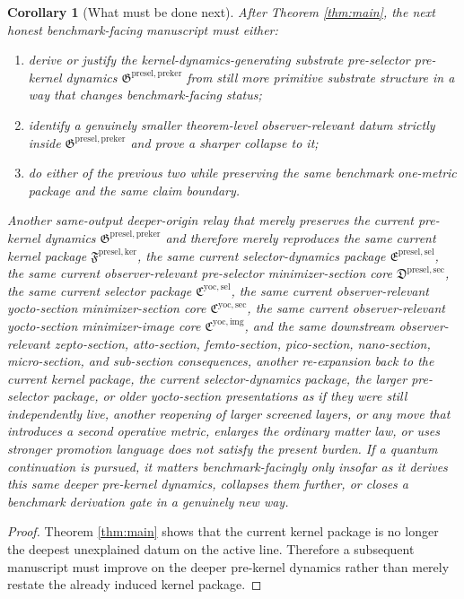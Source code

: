 \documentclass[11pt]{article}
\newcommand{\YoctoImageCore}{\mathfrak C^{\mathrm{yoc,img}}}
\newcommand{\YoctoMinSectionCore}{\mathfrak C^{\mathrm{yoc,sec}}}
\newcommand{\YoctoSelectorPackage}{\mathfrak C^{\mathrm{yoc,sel}}}
\newcommand{\PreSelectorMinSectionCore}{\mathfrak D^{\mathrm{presel,sec}}}
\newcommand{\PreSectionSelectorPackage}{\mathfrak E^{\mathrm{presel,sel}}}
\newcommand{\KernelPackage}{\mathfrak F^{\mathrm{presel,ker}}}
\newcommand{\PreKernelPackage}{\mathfrak G^{\mathrm{presel,preker}}}
\newtheorem{corollary}{Corollary}
\begin{document}
\begin{corollary}[What must be done next]
\label{cor:next}
After Theorem \ref{thm:main}, the next honest benchmark-facing manuscript must either:
\begin{enumerate}
    \item derive or justify the kernel-dynamics-generating substrate pre-selector pre-kernel dynamics \(\PreKernelPackage\) from still more primitive substrate structure in a way that changes benchmark-facing status;
    \item identify a genuinely smaller theorem-level observer-relevant datum strictly inside \(\PreKernelPackage\) and prove a sharper collapse to it;
    \item do either of the previous two while preserving the same benchmark one-metric package and the same claim boundary.
\end{enumerate}
Another same-output deeper-origin relay that merely preserves the current pre-kernel dynamics \(\PreKernelPackage\) and therefore merely reproduces the same current kernel package \(\KernelPackage\), the same current selector-dynamics package \(\PreSectionSelectorPackage\), the same current observer-relevant pre-selector minimizer-section core \(\PreSelectorMinSectionCore\), the same current selector package \(\YoctoSelectorPackage\), the same current observer-relevant yocto-section minimizer-section core \(\YoctoMinSectionCore\), the same current observer-relevant yocto-section minimizer-image core \(\YoctoImageCore\), and the same downstream observer-relevant zepto-section, atto-section, femto-section, pico-section, nano-section, micro-section, and sub-section consequences, another re-expansion back to the current kernel package, the current selector-dynamics package, the larger pre-selector package, or older yocto-section presentations as if they were still independently live, another reopening of larger screened layers, or any move that introduces a second operative metric, enlarges the ordinary matter law, or uses stronger promotion language does not satisfy the present burden. If a quantum continuation is pursued, it matters benchmark-facingly only insofar as it derives this same deeper pre-kernel dynamics, collapses them further, or closes a benchmark derivation gate in a genuinely new way.
\end{corollary}

\begin{proof}
Theorem \ref{thm:main} shows that the current kernel package is no longer the deepest unexplained datum on the active line. Therefore a subsequent manuscript must improve on the deeper pre-kernel dynamics rather than merely restate the already induced kernel package.
\end{proof}
\end{document}
